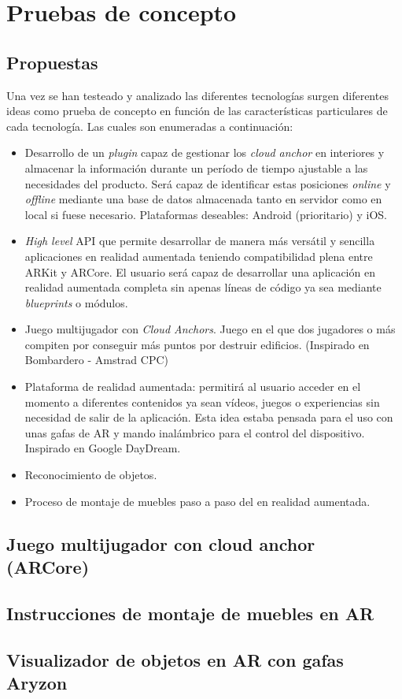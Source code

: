 \chapter{Pruebas de concepto}
\section{Propuestas}
Una vez se han testeado y analizado las diferentes tecnologías surgen diferentes ideas como prueba de concepto en función de las características particulares de cada tecnología. Las cuales son enumeradas a continuación:

\begin{itemize}
\item Desarrollo de un \textit{plugin} capaz de gestionar los \textit{cloud anchor} en interiores y almacenar la información durante un período de tiempo ajustable a las necesidades del producto. Será capaz de identificar estas posiciones \textit{online} y \textit{offline} mediante una base de datos almacenada tanto en servidor como en local si fuese necesario. Plataformas deseables: Android (prioritario) y iOS. 
\item \textit{High level }API que permite desarrollar de manera más versátil y sencilla aplicaciones en realidad aumentada teniendo compatibilidad plena entre ARKit y ARCore. El usuario será capaz de desarrollar una aplicación en realidad aumentada completa sin apenas líneas de código ya sea mediante \textit{blueprints} o módulos.
\item Juego multijugador con \textit{Cloud Anchors}. Juego en el que dos jugadores o más compiten por conseguir más puntos por destruir edificios. (Inspirado en Bombardero - Amstrad CPC)
\item Plataforma de realidad aumentada: permitirá al usuario acceder en el momento a diferentes contenidos ya sean vídeos, juegos o experiencias sin necesidad de salir de la aplicación. Esta idea estaba pensada para el uso con unas gafas de AR y mando inalámbrico para el control del dispositivo. Inspirado en Google DayDream.
\item Reconocimiento de objetos.
\item Proceso de montaje de muebles paso a paso del en realidad aumentada.
\end{itemize}

\section{Juego multijugador con cloud anchor (ARCore)}
\section{Instrucciones de montaje de muebles en AR}
\section{Visualizador de objetos en AR con gafas Aryzon}


\noindent
